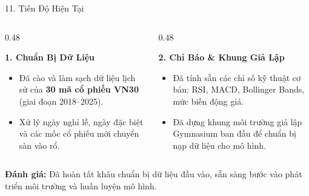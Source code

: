 \documentclass[aspectratio=169, 10pt]{beamer}
\begin{document}
\begin{frame}{11. Tiến Độ Hiện Tại}
  \begin{columns}[t]
    \begin{column}{0.48\textwidth}
      \begin{block}{\textbf{1. Chuẩn Bị Dữ Liệu}}
        \small
        \begin{itemize}
          \item Đã cào và làm sạch dữ liệu lịch sử của \textbf{30 mã cổ phiếu VN30} (giai đoạn 2018--2025).
          \item Xử lý ngày nghỉ lễ, ngày đặc biệt và các mốc cổ phiếu mới chuyển sàn vào rổ.
        \end{itemize}
      \end{block}
    \end{column}

    \begin{column}{0.48\textwidth}
      \begin{block}{\textbf{2. Chỉ Báo \& Khung Giả Lập}}
        \small
        \begin{itemize}
          \item Đã tính sẵn các chỉ số kỹ thuật cơ bản: RSI, MACD, Bollinger Bands, mức biến động giá.
          \item Đã dựng khung môi trường giả lập Gymnasium ban đầu để chuẩn bị nạp dữ liệu cho mô hình.
        \end{itemize}
      \end{block}
    \end{column}
  \end{columns}

  \vspace{1.5ex}
  \begin{center}
    \footnotesize \color{SecondaryNavy}\textbf{Đánh giá:} Đã hoàn tất khâu chuẩn bị dữ liệu đầu vào, sẵn sàng bước vào phát triển môi trường và huấn luyện mô hình.
  \end{center}
\end{frame}
\end{document}
